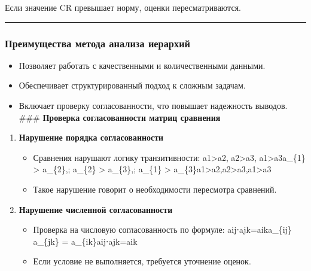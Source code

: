 \documentclass[
]{article}
\providecommand{\tightlist}{%
  \setlength{\itemsep}{0pt}\setlength{\parskip}{0pt}}
\begin{document}
Если значение CR превышает норму, оценки пересматриваются.

\begin{center}\rule{0.5\linewidth}{0.5pt}\end{center}

\subsubsection{\texorpdfstring{\textbf{Преимущества метода анализа
иерархий}}{Преимущества метода анализа иерархий}}\label{ux43fux440ux435ux438ux43cux443ux449ux435ux441ux442ux432ux430-ux43cux435ux442ux43eux434ux430-ux430ux43dux430ux43bux438ux437ux430-ux438ux435ux440ux430ux440ux445ux438ux439}

\begin{itemize}
\tightlist
\item
  Позволяет работать с качественными и количественными данными.
\item
  Обеспечивает структурированный подход к сложным задачам.
\item
  Включает проверку согласованности, что повышает надежность выводов.
  \#\#\# \textbf{Проверка согласованности матриц сравнения}
\end{itemize}

\begin{enumerate}
\def\labelenumi{\arabic{enumi}.}
\item
  \textbf{Нарушение порядка согласованности}

  \begin{itemize}
  \tightlist
  \item
    Сравнения нарушают логику транзитивности:
    a1\textgreater a2,  a2\textgreater a3,  a1\textgreater a3a\_\{1\}
    \textgreater{} a\_\{2\},; a\_\{2\} \textgreater{} a\_\{3\},;
    a\_\{1\} \textgreater{}
    a\_\{3\}a1\hspace{0pt}\textgreater a2\hspace{0pt},a2\hspace{0pt}\textgreater a3\hspace{0pt},a1\hspace{0pt}\textgreater a3\hspace{0pt}
  \item
    Такое нарушение говорит о необходимости пересмотра сравнений.
  \end{itemize}
\item
  \textbf{Нарушение численной согласованности}

  \begin{itemize}
  \tightlist
  \item
    Проверка на числовую согласованность по формуле:
    aij⋅ajk=aika\_\{ij\} \cdot a\_\{jk\} =
    a\_\{ik\}aij\hspace{0pt}⋅ajk\hspace{0pt}=aik\hspace{0pt}
  \item
    Если условие не выполняется, требуется уточнение оценок.
  \end{itemize}
\end{enumerate}
\end{document}
